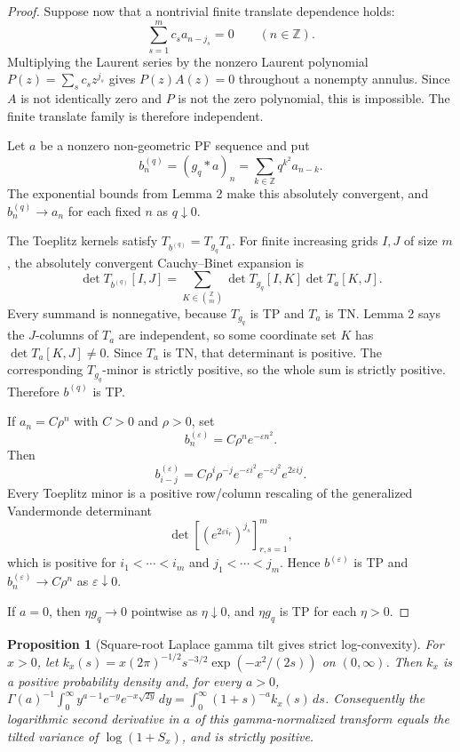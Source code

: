 \documentclass[11pt]{article}
\numberwithin{equation}{section}
\newtheorem{proposition}[theorem]{Proposition}
\theoremstyle{definition}
\theoremstyle{remark}
\newcommand{\1}{\mathbf 1}
\begin{document}
\begin{proof}
Suppose now that a nontrivial finite translate dependence holds:
\[
\sum_{s=1}^m c_s a_{n-j_s}=0\qquad(n\in\mathbb Z).
\]
Multiplying the Laurent series by the nonzero Laurent polynomial \(P(z)=\sum_s c_s z^{j_s}\) gives \(P(z)A(z)=0\) throughout a nonempty annulus. Since \(A\) is not identically zero and \(P\) is not the zero polynomial, this is impossible. The finite translate family is therefore independent.

Let \(a\) be a nonzero non-geometric PF sequence and put
\[
b^{(q)}_n=(g_q*a)_n=\sum_{k\in\mathbb Z}q^{k^2}a_{n-k}.
\]
The exponential bounds from Lemma 2 make this absolutely convergent, and \(b^{(q)}_n\to a_n\) for each fixed \(n\) as \(q\downarrow0\).

The Toeplitz kernels satisfy \(T_{b^{(q)}}=T_{g_q}T_a\). For finite increasing grids \(I,J\) of size \(m\), the absolutely convergent Cauchy--Binet expansion is
\[
\det T_{b^{(q)}}[I,J]
=
\sum_{K\in{\binom{\mathbb Z}{m}}}
\det T_{g_q}[I,K]\det T_a[K,J].
\]
Every summand is nonnegative, because \(T_{g_q}\) is TP and \(T_a\) is TN. Lemma 2 says the \(J\)-columns of \(T_a\) are independent, so some coordinate set \(K\) has \(\det T_a[K,J]\neq0\). Since \(T_a\) is TN, that determinant is positive. The corresponding \(T_{g_q}\)-minor is strictly positive, so the whole sum is strictly positive. Therefore \(b^{(q)}\) is TP.

If \(a_n=C\rho^n\) with \(C>0\) and \(\rho>0\), set
\[
b^{(\varepsilon)}_n=C\rho^n e^{-\varepsilon n^2}.
\]
Then
\[
b^{(\varepsilon)}_{i-j}
=
C\rho^i\rho^{-j}e^{-\varepsilon i^2}e^{-\varepsilon j^2}e^{2\varepsilon ij}.
\]
Every Toeplitz minor is a positive row/column rescaling of the generalized Vandermonde determinant
\[
\det[(e^{2\varepsilon i_r})^{j_s}]_{r,s=1}^m,
\]
which is positive for \(i_1<\cdots<i_m\) and \(j_1<\cdots<j_m\). Hence \(b^{(\varepsilon)}\) is TP and \(b^{(\varepsilon)}_n\to C\rho^n\) as \(\varepsilon\downarrow0\).

If \(a=0\), then \(\eta g_q\to0\) pointwise as \(\eta\downarrow0\), and \(\eta g_q\) is TP for each \(\eta>0\).
\end{proof}

\begin{proposition}[Square-root Laplace gamma tilt gives strict log-convexity]
\label{res:sqrtlaplace-gammatilt-logconvexity}
For \(x>0\), let \(k_x(s)=x(2\pi)^{-1/2}s^{-3/2}\exp(-x^2/(2s))\) on \((0,\infty)\). Then \(k_x\) is a positive probability density and, for every \(a>0\), \(\Gamma(a)^{-1}\int_0^\infty y^{a-1}e^{-y}e^{-x\sqrt{2y}}\,dy=\int_0^\infty(1+s)^{-a}k_x(s)\,ds\). Consequently the logarithmic second derivative in \(a\) of this gamma-normalized transform equals the tilted variance of \(\log(1+S_x)\), and is strictly positive.
\end{proposition}
\end{document}
